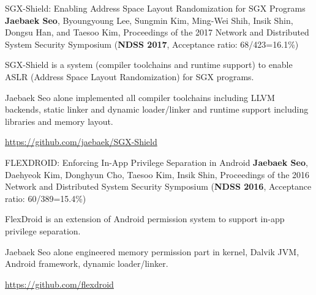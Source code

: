 

\begin{cventries}

  \paperentry
    {SGX-Shield: Enabling Address Space Layout Randomization for SGX Programs} %
    {\textbf{Jaebaek Seo}, Byoungyoung Lee, Sungmin Kim, Ming-Wei Shih, Insik Shin, Dongsu Han, and Taesoo Kim, } %
    { Proceedings of the 2017 Network and Distributed System Security Symposium (\textbf{NDSS 2017}, Acceptance ratio: 68/423=16.1\%) } %
    {
        \begin{cvitems} %
        \item {SGX-Shield is a system (compiler toolchains and runtime support)
            to enable ASLR (Address Space Layout Randomization) for SGX programs.}
        \item {Jaebaek Seo alone implemented all compiler toolchains including
                LLVM backends, static linker and dynamic loader/linker and runtime
            support including libraries and memory layout.}
        \item {\url{https://github.com/jaebaek/SGX-Shield}}
        \end{cvitems}
    }

  \paperentry
    { FLEXDROID: Enforcing In-App Privilege Separation in Android } %
    { \textbf{Jaebaek Seo}, Daehyeok Kim, Donghyun Cho, Taesoo Kim, Insik Shin, }
    { Proceedings of the 2016 Network and Distributed System Security Symposium (\textbf{NDSS 2016}, Acceptance ratio: 60/389=15.4\%) } %
    {
        \begin{cvitems} %
        \item {FlexDroid is an extension of Android permission system
            to support in-app privilege separation.}
        \item {Jaebaek Seo alone engineered memory permission part in kernel,
            Dalvik JVM, Android framework, dynamic loader/linker.}
        \item {\url{https://github.com/flexdroid}}
        \end{cvitems}
    }


\end{cventries}
